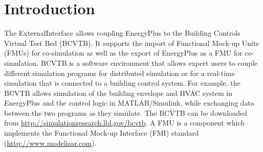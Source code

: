 \section{Introduction}\label{introduction}

The ExternalInterface allows coupling EnergyPlus to the Building Controls Virtual Test Bed (BCVTB). It supports the import of Functional Mock-up Units (FMUs) for co-simulation as well as the export of EnergyPlus as a FMU for co-simulation. BCVTB is a software environment that allows expert users to couple different simulation programs for distributed simulation or for a real-time simulation that is connected to a building control system. For example, the BCVTB allows simulation of the building envelope and HVAC system in EnergyPlus and the control logic in MATLAB/Simulink, while exchanging data between the two programs as they simulate. The BCVTB can be downloaded from \url{http://simulationresearch.lbl.gov/bcvtb}. A FMU is a component which implements the Functional Mock-up Interface (FMI) standard (\url{http://www.modelisar.com}).
